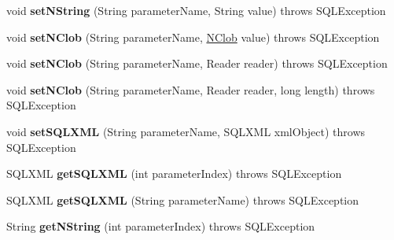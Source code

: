\begin{DoxyCompactItemize}
void {\bfseries set\+N\+String} (String parameter\+Name, String value)  throws S\+Q\+L\+Exception 
\item 
\mbox{\label{classcom_1_1mysql_1_1cj_1_1jdbc_1_1_callable_statement_a1ab3bcc87b0d60c29ce5eba3f6d0b19d}} 
void {\bfseries set\+N\+Clob} (String parameter\+Name, \mbox{\hyperlink{classcom_1_1mysql_1_1cj_1_1jdbc_1_1_n_clob}{N\+Clob}} value)  throws S\+Q\+L\+Exception 
\item 
\mbox{\label{classcom_1_1mysql_1_1cj_1_1jdbc_1_1_callable_statement_ad4b6ab140e853c27e1582981665d925a}} 
void {\bfseries set\+N\+Clob} (String parameter\+Name, Reader reader)  throws S\+Q\+L\+Exception 
\item 
\mbox{\label{classcom_1_1mysql_1_1cj_1_1jdbc_1_1_callable_statement_acec0c18ed673c688052f2b4aff9b3846}} 
void {\bfseries set\+N\+Clob} (String parameter\+Name, Reader reader, long length)  throws S\+Q\+L\+Exception 
\item 
\mbox{\label{classcom_1_1mysql_1_1cj_1_1jdbc_1_1_callable_statement_a91114c0dd4622e91165da9db928725b3}} 
void {\bfseries set\+S\+Q\+L\+X\+ML} (String parameter\+Name, S\+Q\+L\+X\+ML xml\+Object)  throws S\+Q\+L\+Exception 
\item 
\mbox{\label{classcom_1_1mysql_1_1cj_1_1jdbc_1_1_callable_statement_a0029a0f89063356028ef8d795e1b2f21}} 
S\+Q\+L\+X\+ML {\bfseries get\+S\+Q\+L\+X\+ML} (int parameter\+Index)  throws S\+Q\+L\+Exception 
\item 
\mbox{\label{classcom_1_1mysql_1_1cj_1_1jdbc_1_1_callable_statement_a6eb618a78c27c987829d5dc97d540065}} 
S\+Q\+L\+X\+ML {\bfseries get\+S\+Q\+L\+X\+ML} (String parameter\+Name)  throws S\+Q\+L\+Exception 
\item 
\mbox{\label{classcom_1_1mysql_1_1cj_1_1jdbc_1_1_callable_statement_a00abcfef233b8ec80a0edb0e7daceeaa}} 
String {\bfseries get\+N\+String} (int parameter\+Index)  throws S\+Q\+L\+Exception 

\end{DoxyCompactItemize}
